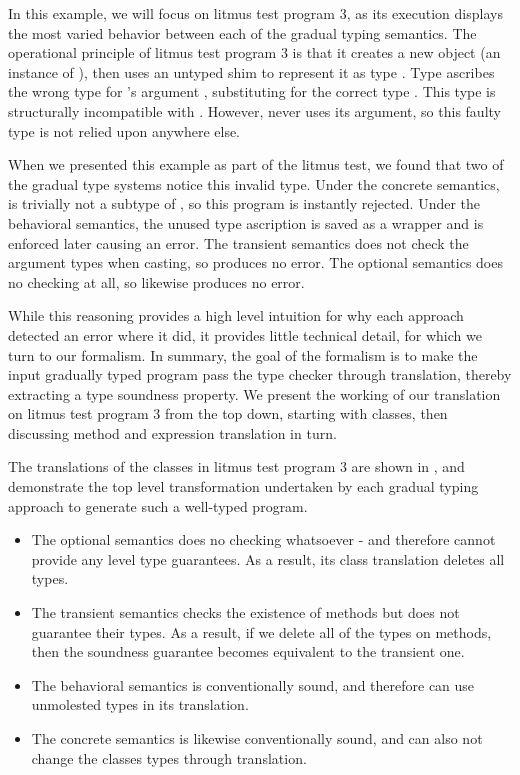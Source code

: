 \documentclass[a4paper,USenglish]{tex/lipics-v2016}
\begin{document}
In this example, we will focus on litmus test program 3, as its execution
displays the most varied behavior between each of the gradual typing
semantics. The operational principle of litmus test program 3 is that it
creates a new object (an instance of \C), then uses an untyped shim to
represent it as type . Type  ascribes the wrong type for 's
argument \x, substituting  for the correct type . This type 
is structurally incompatible with . However,  never uses its
argument, so this faulty type is not relied upon anywhere else.

When we presented this example as part of the litmus test, we found that two
of the gradual type systems notice this invalid type. Under the concrete
semantics,  is trivially not a subtype of , so this program is
instantly rejected. Under the behavioral semantics, the unused type ascription
is saved as a wrapper and is enforced later causing an error. The transient
semantics does not check the argument types when casting, so produces no
error. The optional semantics does no checking at all, so likewise produces
no error.

While this reasoning provides a high level intuition for why each approach
detected an error where it did, it provides little technical detail, for which
we turn to our formalism. In summary, the goal of the formalism is to make the
input gradually typed program pass the \kafka type checker through
translation, thereby extracting a type soundness property. We present the
working of our translation on litmus test program 3 from the top down,
starting with classes, then discussing method and expression translation in
turn.

The translations of the classes in litmus test program 3 are shown in
, and demonstrate the top level transformation undertaken
by each gradual typing approach to generate such a well-typed \kafka program.

\begin{itemize}
  \item The optional semantics does no checking whatsoever - and therefore cannot
  provide any \kafka level type guarantees. As a result, its class translation 
  deletes all types.
  \item The transient semantics checks the existence of methods but does not
  guarantee their types. As a result, if we delete all of the types on methods,
  then the \kafka soundness guarantee becomes equivalent to the transient one. 
  \item The behavioral semantics is conventionally sound, and therefore can 
  use unmolested types in its \kafka translation.
  \item The concrete semantics is likewise conventionally sound, and can also
  not change the classes types through translation.
\end{itemize}
\end{document}

